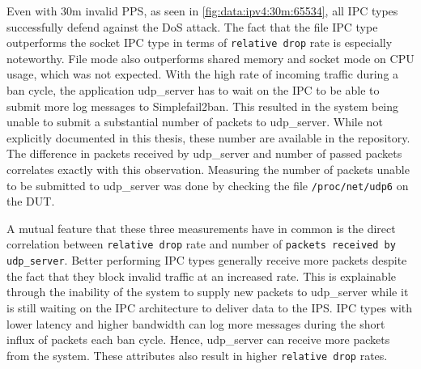 Even with 30m invalid PPS, as seen in \ref{fig:data:ipv4:30m:65534}, all IPC types successfully defend against the DoS attack.
The fact that the file IPC type outperforms the socket IPC type in terms of \texttt{relative drop} rate is especially noteworthy.
File mode also outperforms shared memory and socket mode on CPU usage, which was not expected.
With the high rate of incoming traffic during a ban cycle, the application udp\_server has to wait on the IPC to be able to submit more log messages to Simplefail2ban.
This resulted in the system being unable to submit a substantial number of packets to udp\_server.
While not explicitly documented in this thesis, these number are available in the repository\cite{git:repoOfThesis}.
The difference in packets received by udp\_server and number of passed packets correlates exactly with this observation.
Measuring the number of packets unable to be submitted to udp\_server was done by checking the file \texttt{/proc/net/udp6} on the DUT.

A mutual feature that these three measurements have in common is the direct correlation between \texttt{relative drop} rate and number of \texttt{packets received by udp\_server}.
Better performing IPC types generally receive more packets despite the fact that they block invalid traffic at an increased rate.
This is explainable through the inability of the system to supply new packets to udp\_server while it is still waiting on the IPC architecture to deliver data to the IPS.
IPC types with lower latency and higher bandwidth can log more messages during the short influx of packets each ban cycle.
Hence, udp\_server can receive more packets from the system.
These attributes also result in higher \texttt{relative drop} rates.

